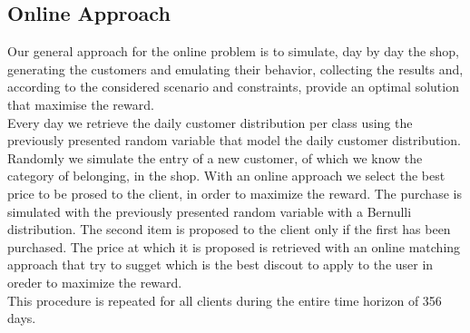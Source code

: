 \subsection*{Online Approach}
Our general approach for the online problem is to simulate, day by day the shop, generating the customers and emulating their behavior, collecting the results and, according to the considered scenario and constraints, provide an optimal solution that maximise the reward.\\
Every day we retrieve the daily customer distribution per class using the previously presented random variable that model the daily customer distribution. Randomly we simulate the entry of a new customer, of which we know the category of belonging, in the shop. With an online approach we select the best price to be prosed to the client, in order to maximize the reward. The purchase is simulated with the previously presented random variable with a Bernulli distribution.
The second item is proposed to the client only if the first has been purchased. The price at which it is proposed is retrieved with an online matching approach that try to sugget which is the best discout to apply to the user in oreder to maximize the reward.\\
This procedure is repeated for all clients during the entire time horizon of 356 days. 
